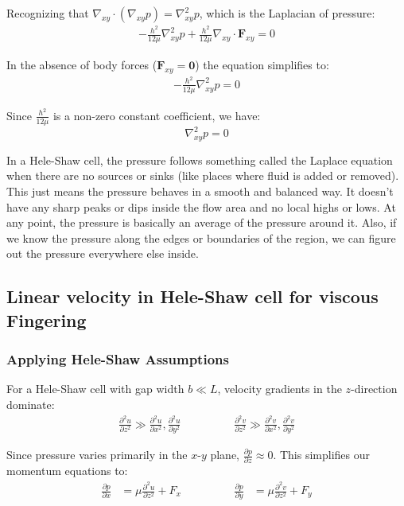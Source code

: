 \documentclass[12pt,a4paper]{article}
\begin{document}
Recognizing that $\nabla_{xy} \cdot (\nabla_{xy} p) = \nabla^2_{xy} p$, which is the Laplacian of pressure:
\begin{align}
    -\frac{h^2}{12\mu}\nabla^2_{xy} p + \frac{h^2}{12\mu}\nabla_{xy} \cdot \mathbf{F}_{xy} = 0
\end{align}

In the absence of body forces ($\mathbf{F}_{xy} = \mathbf{0}$) the equation simplifies to:
\begin{align}
    -\frac{h^2}{12\mu}\nabla^2_{xy} p = 0
\end{align}

Since $\frac{h^2}{12\mu}$ is a non-zero constant coefficient, we have:
\[
\boxed{
    \nabla^2_{xy} p = 0
}
\]

In a Hele-Shaw cell, the pressure follows something called the Laplace equation when there are no sources or sinks (like places where fluid is added or removed). This just means the pressure behaves in a smooth and balanced way. It doesn’t have any sharp peaks or dips inside the flow area and no local highs or lows. At any point, the pressure is basically an average of the pressure around it. Also, if we know the pressure along the edges or boundaries of the region, we can figure out the pressure everywhere else inside.

\subsection{Linear velocity in Hele-Shaw cell for  viscous Fingering}

\subsubsection*{Applying Hele-Shaw Assumptions}

For a Hele-Shaw cell with gap width $b \ll L$, velocity gradients in the $z$-direction dominate:
\begin{equation}
 \begin{aligned}
    \frac{\partial^2 u}{\partial z^2} \gg \frac{\partial^2 u}{\partial x^2}, \frac{\partial^2 u}{\partial y^2} 
    \hspace{2cm}
    \frac{\partial^2 v}{\partial z^2} \gg \frac{\partial^2 v}{\partial x^2}, \frac{\partial^2 v}{\partial y^2}
\end{aligned}   
\end{equation}


Since pressure varies primarily in the $x$-$y$ plane, $\frac{\partial p}{\partial z} \approx 0$. 
This simplifies our momentum equations to:
\begin{equation}
\begin{aligned}
    \frac{\partial p}{\partial x} &= \mu \frac{\partial^2 u}{\partial z^2} + F_x \hspace{2cm}
    \frac{\partial p}{\partial y} &= \mu \frac{\partial^2 v}{\partial z^2} + F_y
\end{aligned}
\end{equation}
\end{document}

